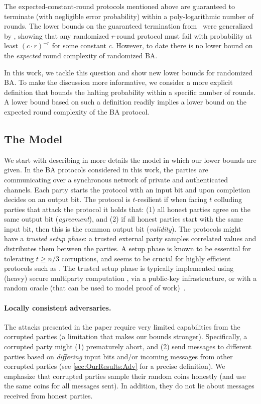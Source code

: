 The expected-constant-round protocols mentioned above are guaranteed to terminate (with negligible error probability) within a poly-logarithmic number of rounds.
The lower bounds on the guaranteed termination from~\cite{FL82,DS83} were generalized by \cite{CMS89,KY86}, showing that any randomized $r$-round protocol must fail with probability at least $(c\cdot r)^{-r}$ for some constant $c$. However, to date there is no lower bound on the \emph{expected} round complexity of randomized BA.

In this work, we tackle this question and show new lower bounds for randomized BA. To make the discussion more informative, we consider a more explicit definition that bounds the halting probability within a specific number of rounds. A lower bound based on such a definition readily implies a lower bound on the expected round complexity of the BA protocol.

\subsection{The Model}\label{sec:intro:model}
We start with describing in more details the model in which our lower bounds are given. In the BA protocols considered in this work, the parties are communicating over a synchronous network of private and authenticated channels. Each party starts the protocol with an input bit and upon completion decides on an output bit. The protocol is $t$-resilient if when facing $t$ colluding parties that attack the protocol it holds that: (1) all honest parties agree on the same output bit (\emph{agreement}), and (2) if all honest parties start with the same input bit, then this is the common output bit (\emph{validity}). The protocols might have a \emph{trusted setup phase}: a trusted external party samples correlated values and distributes them between the parties. A setup phase is known to be essential for tolerating $t\geq n/3$ corruptions, and seems to be crucial for highly efficient protocols such as \cite{Micali17,SM16,MV17,ADDNR19,ACDNPRS19}. The trusted setup phase is typically implemented using (heavy) secure multiparty computation \cite{BCGTV15,BGG18}, via a public-key infrastructure, or with a random oracle (that can be used to model proof of work)~\cite{PS17}.

\paragraph{Locally consistent adversaries.}
The attacks presented in the paper require very limited capabilities from the corrupted parties (a limitation that makes our bounds stronger). Specifically, a corrupted party might (1) prematurely abort, and (2) send messages to different parties based on \emph{differing} input bits and/or incoming messages from other corrupted parties (see \cref{sec:OurResults:Adv} for a precise definition). We emphasize that corrupted parties sample their random coins honestly (and use the same coins for all messages sent). In addition, they do not lie about messages received from honest parties.

